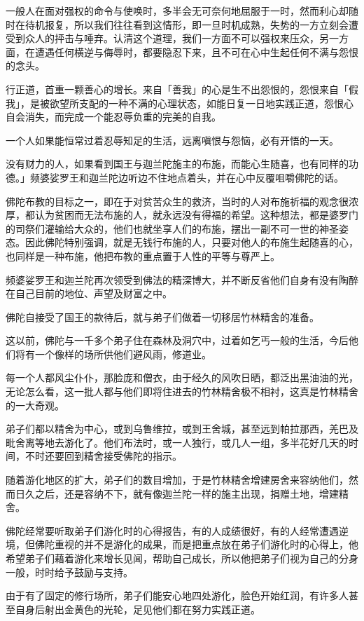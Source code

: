 \documentclass[twoside,openany]{book}
\begin{document}
一般人在面对强权的命令与使唤时，多半会无可奈何地屈服于一时，然而利心却随时在待机报复，所以我们往往看到这情形，即一旦时机成熟，失势的一方立刻会遭受到众人的抨击与唾弃。认清这个道理，我们一方面不可以强权来压众，另一方面，在遭遇任何横逆与侮辱时，都要隐忍下来，且不可在心中生起任何不满与怨恨的念头。

行正道，首重一颗善心的增长。来自「善我」的心是生不出怨恨的，怨恨来自「假我」，是被欲望所支配的一种不满的心理状态，如能日复一日地实践正道，怨恨心自会消失，而完成一个能忍辱负重的完美的自我。

一个人如果能恒常过着忍辱知足的生活，远离嗔恨与怨恼，必有开悟的一天。

没有财力的人，如果看到国王与迦兰陀施主的布施，而能心生随喜，也有同样的功德。」频婆娑罗王和迦兰陀边听边不住地点着头，并在心中反覆咀嚼佛陀的话。

佛陀布教的目标之一，即在于对贫苦众生的救济，当时的人对布施祈福的观念很浓厚，都认为贫困而无法布施的人，就永远没有得福的希望。这种想法，都是婆罗门的司祭们灌输给大众的，他们也就坐享人们的布施，摆出一副不可一世的神圣姿态。因此佛陀特别强调，就是无钱行布施的人，只要对他人的布施生起随喜的心，也同样是一种布施，他把布教的重点置于人性的平等与尊严上。

频婆娑罗王和迦兰陀再次领受到佛法的精深博大，并不断反省他们自身有没有陶醉在自己目前的地位、声望及财富之中。

佛陀自接受了国王的款待后，就与弟子们做着一切移居竹林精舍的准备。

这以前，佛陀与一千多个弟子住在森林及洞穴中，过着如乞丐一般的生活，今后他们将有一个像样的场所供他们避风雨，修道业。

每一个人都风尘仆仆，那脸庞和僧衣，由于经久的风吹日晒，都泛出黑油油的光，无论怎么看，这一批人都与他们即将住进去的竹林精舍极不相衬，这真是竹林精舍的一大奇观。

弟子们都以精舍为中心，或到乌鲁维拉，或到王舍城，甚至远到帕拉那西，羌巴及毗舍离等地去游化了。他们布法时，或一人独行，或几人一组，多半花好几天的时间，不时还要回到精舍接受佛陀的指示。

随着游化地区的扩大，弟子们的数目增加，于是竹林精舍增建房舍来容纳他们，然而日久之后，还是容纳不下，就有像迦兰陀一样的施主出现，捐赠土地，增建精舍。

佛陀经常要听取弟子们游化时的心得报告，有的人成绩很好，有的人经常遭遇逆境，但佛陀重视的并不是游化的成果，而是把重点放在弟子们游化时的心得上，他希望弟子们藉着游化来增长见闻，帮助自己成长，所以他把弟子们视为自己的分身一般，时时给予鼓励与支持。

由于有了固定的修行场所，弟子们能安心地四处游化，脸色开始红润，有许多人甚至自身后射出金黄色的光轮，足见他们都在努力实践正道。
\end{document}
